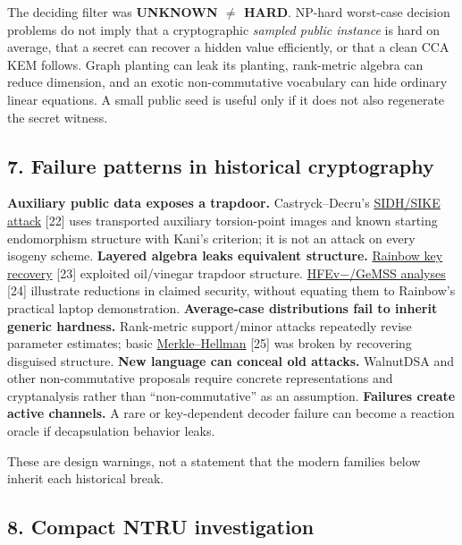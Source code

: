 \documentclass[
  10pt,
  a4paper,
]{article}
\begin{document}
The deciding filter was \textbf{UNKNOWN \(\ne\) HARD}. NP-hard
worst-case decision problems do not imply that a cryptographic
\emph{sampled public instance} is hard on average, that a secret can
recover a hidden value efficiently, or that a clean CCA KEM follows.
Graph planting can leak its planting, rank-metric algebra can reduce
dimension, and an exotic non-commutative vocabulary can hide ordinary
linear equations. A small public seed is useful only if it does not also
regenerate the secret witness.

\hypertarget{failure-patterns-in-historical-cryptography}{%
\subsection{7. Failure patterns in historical
cryptography}\label{failure-patterns-in-historical-cryptography}}

\textbf{Auxiliary public data exposes a trapdoor.} Castryck--Decru's
\href{https://eprint.iacr.org/2022/975}{SIDH/SIKE attack} {[}22{]} uses
transported auxiliary torsion-point images and known starting
endomorphism structure with Kani's criterion; it is not an attack on
every isogeny scheme. \textbf{Layered algebra leaks equivalent
structure.} \href{https://eprint.iacr.org/2022/214}{Rainbow key
recovery} {[}23{]} exploited oil/vinegar trapdoor structure.
\href{https://csrc.nist.gov/CSRC/media/Events/third-pqc-standardization-conference/documents/accepted-papers/petzoldt-efficient-key-pqc2021.pdf}{HFEv−/GeMSS
analyses} {[}24{]} illustrate reductions in claimed security, without
equating them to Rainbow's practical laptop demonstration.
\textbf{Average-case distributions fail to inherit generic hardness.}
Rank-metric support/minor attacks repeatedly revise parameter estimates;
basic
\href{https://www-igm.univ-mlv.fr/~jyt/Crypto/crack_merkle_hellman.pdf}{Merkle--Hellman}
{[}25{]} was broken by recovering disguised structure. \textbf{New
language can conceal old attacks.} WalnutDSA and other non-commutative
proposals require concrete representations and cryptanalysis rather than
``non-commutative'' as an assumption. \textbf{Failures create active
channels.} A rare or key-dependent decoder failure can become a reaction
oracle if decapsulation behavior leaks.

These are design warnings, not a statement that the modern families
below inherit each historical break.

\hypertarget{compact-ntru-investigation}{%
\subsection{8. Compact NTRU
investigation}\label{compact-ntru-investigation}}
\end{document}
